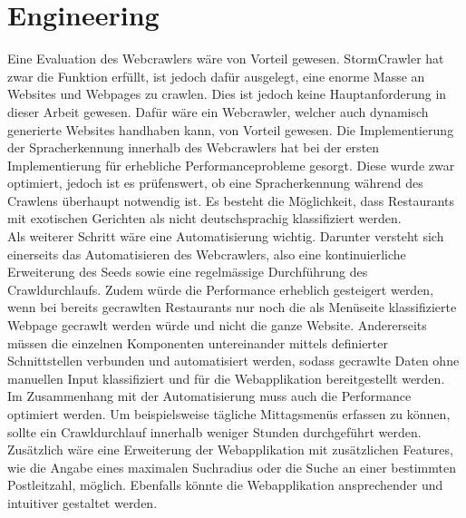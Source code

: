 \section{Engineering}
Eine Evaluation des Webcrawlers wäre von Vorteil gewesen.
StormCrawler hat zwar die Funktion erfüllt, ist jedoch dafür ausgelegt, eine enorme Masse an Websites und Webpages zu crawlen.
Dies ist jedoch keine Hauptanforderung in dieser Arbeit gewesen.
Dafür wäre ein Webcrawler, welcher auch dynamisch generierte Websites handhaben kann, von Vorteil gewesen.
Die Implementierung der Spracherkennung innerhalb des Webcrawlers hat bei der ersten Implementierung für erhebliche Performanceprobleme gesorgt.
Diese wurde zwar optimiert, jedoch ist es prüfenswert, ob eine Spracherkennung während des Crawlens überhaupt notwendig ist.
Es besteht die Möglichkeit, dass Restaurants mit exotischen Gerichten als nicht deutschsprachig klassifiziert werden.\\
Als weiterer Schritt wäre eine Automatisierung wichtig.
Darunter versteht sich einerseits das Automatisieren des Webcrawlers, also eine kontinuierliche Erweiterung des Seeds sowie eine regelmässige Durchführung des Crawldurchlaufs.
Zudem würde die Performance erheblich gesteigert werden, wenn bei bereits gecrawlten Restaurants nur noch die als Menüseite klassifizierte Webpage gecrawlt werden würde und nicht die ganze Website.
Andererseits müssen die einzelnen Komponenten untereinander mittels definierter Schnittstellen verbunden und automatisiert werden, sodass gecrawlte Daten ohne manuellen Input klassifiziert und für die Webapplikation bereitgestellt werden.\\
Im Zusammenhang mit der Automatisierung muss auch die Performance optimiert werden.
Um beispielsweise tägliche Mittagsmenüs erfassen zu können, sollte ein Crawldurchlauf innerhalb weniger Stunden durchgeführt werden.\\
Zusätzlich wäre eine Erweiterung der Webapplikation mit zusätzlichen Features, wie die Angabe eines maximalen Suchradius oder die Suche an einer bestimmten Postleitzahl, möglich.
Ebenfalls könnte die Webapplikation ansprechender und intuitiver gestaltet werden.


